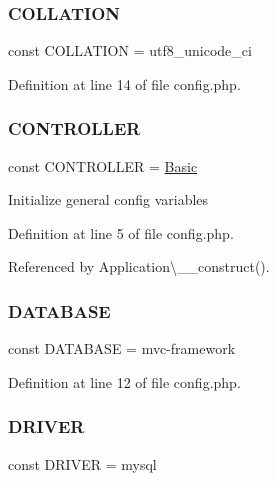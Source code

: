 \subsubsection{\texorpdfstring{C\+O\+L\+L\+A\+T\+I\+ON}{COLLATION}}
{\footnotesize\ttfamily const C\+O\+L\+L\+A\+T\+I\+ON = \textquotesingle{}utf8\+\_\+unicode\+\_\+ci\textquotesingle{}}



Definition at line 14 of file config.\+php.

\hypertarget{config_8php_afa55a6839ec4ad32fc00879d78229356}{}\label{config_8php_afa55a6839ec4ad32fc00879d78229356} 
\subsubsection{\texorpdfstring{C\+O\+N\+T\+R\+O\+L\+L\+ER}{CONTROLLER}}
{\footnotesize\ttfamily const C\+O\+N\+T\+R\+O\+L\+L\+ER = \textquotesingle{}\hyperlink{class_basic}{Basic}\textquotesingle{}}

Initialize general config variables 

Definition at line 5 of file config.\+php.



Referenced by Application\textbackslash{}\+\_\+\+\_\+construct().

\hypertarget{config_8php_a671e180a0a9486e82d3f3ccb1f4761f6}{}\label{config_8php_a671e180a0a9486e82d3f3ccb1f4761f6} 
\subsubsection{\texorpdfstring{D\+A\+T\+A\+B\+A\+SE}{DATABASE}}
{\footnotesize\ttfamily const D\+A\+T\+A\+B\+A\+SE = \textquotesingle{}mvc-\/framework\textquotesingle{}}



Definition at line 12 of file config.\+php.

\hypertarget{config_8php_a245dc418bdafd94609f05283931c7fc2}{}\label{config_8php_a245dc418bdafd94609f05283931c7fc2} 
\subsubsection{\texorpdfstring{D\+R\+I\+V\+ER}{DRIVER}}
{\footnotesize\ttfamily const D\+R\+I\+V\+ER = \textquotesingle{}mysql\textquotesingle{}}



